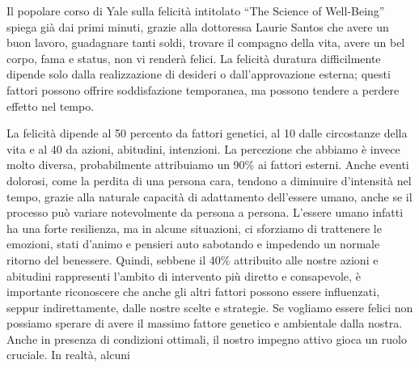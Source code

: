\documentclass[12pt]{book} %
\begin{document}
Il popolare corso di Yale sulla felicità intitolato “The Science of
Well-Being” spiega già dai primi minuti, grazie
alla dottoressa Laurie Santos che avere un buon lavoro, guadagnare tanti soldi, trovare il compagno della vita, avere
un bel corpo, fama e status, non vi renderà felici. 
La felicità duratura difficilmente dipende solo dalla realizzazione di desideri o dall’approvazione esterna; questi fattori possono offrire soddisfazione temporanea, ma possono tendere a perdere effetto nel tempo.

La felicità dipende al 50 percento da fattori genetici, al 10 dalle
circostanze della vita e al 40 da azioni, abitudini, intenzioni. La percezione che abbiamo è invece molto diversa,
probabilmente attribuiamo un 90\% ai fattori esterni. Anche eventi dolorosi, come la perdita di una persona cara, tendono a diminuire d’intensità nel tempo, grazie alla naturale capacità di adattamento dell’essere umano, anche se il processo può variare notevolmente da persona a persona. L'essere umano infatti ha una forte resilienza, ma in alcune situazioni, ci sforziamo di trattenere le emozioni, stati d'animo e pensieri auto sabotando e impedendo un
normale ritorno del benessere. Quindi, sebbene il 40\% attribuito alle nostre azioni e abitudini rappresenti l'ambito di intervento più diretto e consapevole, è importante riconoscere che anche gli altri fattori possono essere influenzati, seppur indirettamente, dalle nostre scelte e strategie. Se vogliamo
essere felici non possiamo sperare di avere il massimo fattore genetico e ambientale dalla nostra. Anche in presenza di condizioni ottimali, il nostro impegno attivo gioca un ruolo cruciale. In realtà, alcuni
\end{document}
